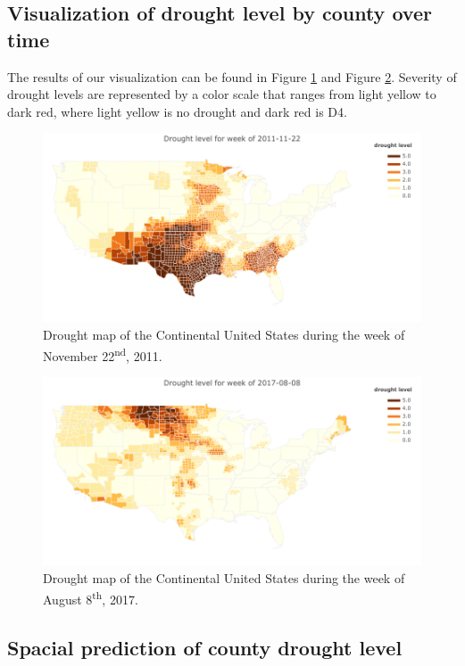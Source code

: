 \documentclass{article}
\begin{document}
\subsection{Visualization of drought level by county over time}
The results of our visualization can be found in Figure \ref{fig:fullmap1} and Figure \ref{fig:fullmap2}. Severity of drought levels are represented by a color scale that ranges from light yellow to dark red, where light yellow is no drought and dark red is D4. 
\begin{figure}[hbt!]
    \centering
    \includegraphics[width =  \textwidth]{DroughtLevel_wk_2011-11-22.png}
    \caption{Drought map of the Continental United States during the week of November 22\textsuperscript{nd}, 2011.}
    \label{fig:fullmap1}
\end{figure}

\begin{figure}[hbt!]
    \centering
    \includegraphics[width =  \textwidth]{DroughtLevel_wk_2017-08-08.png}
    \caption{Drought map of the Continental United States during the week of August 8\textsuperscript{th}, 2017.}
    \label{fig:fullmap2}
\end{figure}


\clearpage 
\subsection{Spacial prediction of county drought level}
\end{document}
